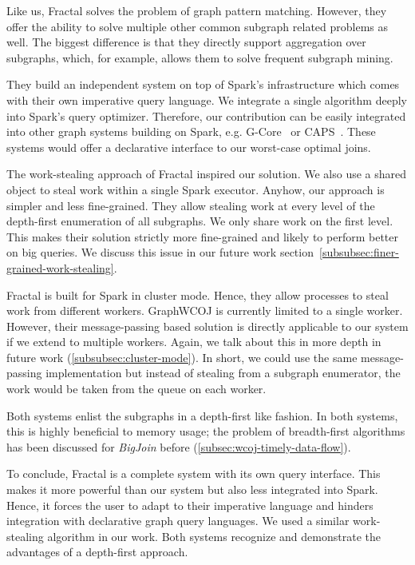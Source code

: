 Like us, Fractal solves the problem of graph pattern matching.
However, they offer the ability to solve multiple other common subgraph related problems as well.
The biggest difference is that they directly support aggregation over subgraphs, which, for example,
allows them to solve frequent subgraph mining.

They build an independent system on top of Spark's infrastructure which comes with their own
imperative query language.
We integrate a single algorithm deeply into Spark's query optimizer.
Therefore, our contribution can be easily integrated into other graph systems building on Spark, e.g.
G-Core~\cite{gcore} or CAPS~\cite{caps}.
These systems would offer a declarative interface to our worst-case optimal joins.

The work-stealing approach of Fractal inspired our solution.
We also use a shared object to steal work within a single Spark executor.
Anyhow, our approach is simpler and less fine-grained.
They allow stealing work at every level of the depth-first enumeration of all subgraphs.
We only share work on the first level.
This makes their solution strictly more fine-grained and likely to perform better on big
queries.
We discuss this issue in our future work section~\ref{subsubsec:finer-grained-work-stealing}.

Fractal is built for Spark in cluster mode.
Hence, they allow processes to steal work from different workers.
GraphWCOJ is currently limited to a single worker.
However, their message-passing based solution is directly applicable to our system if
we extend to multiple workers.
Again, we talk about this in more depth in future work (\ref{subsubsec:cluster-mode}).
In short, we could use the same message-passing implementation but instead of stealing
from a subgraph enumerator, the work would be taken from the queue on each worker.

Both systems enlist the subgraphs in a depth-first like fashion.
In both systems, this is highly beneficial to memory usage;
the problem of breadth-first algorithms has been discussed for \textit{BigJoin} before (\cref{subsec:wcoj-timely-data-flow}).

To conclude, Fractal is a complete system with its own query interface.
This makes it more powerful than our system but also less integrated into Spark.
Hence, it forces the user to adapt to their imperative language and hinders
integration with declarative graph query languages.
We used a similar work-stealing algorithm in our work.
Both systems recognize and demonstrate the advantages of a depth-first approach.

